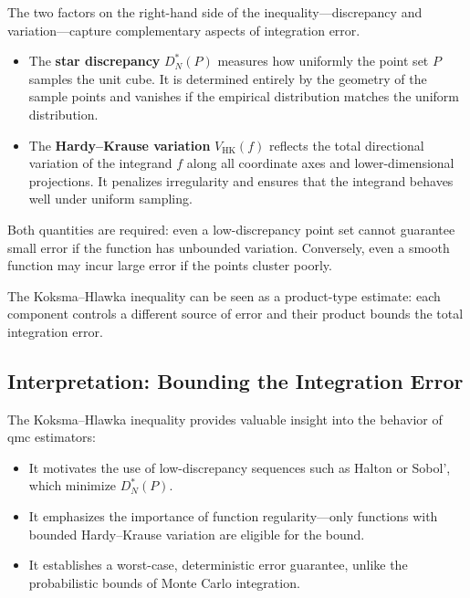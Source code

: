 The two factors on the right-hand side of the inequality—discrepancy and variation—capture complementary aspects of integration error.

\begin{itemize}
    \item The \textbf{star discrepancy} $D_N^*(P)$ measures how uniformly the point set $P$ samples the unit cube. It is determined entirely by the geometry of the sample points and vanishes if the empirical distribution matches the uniform distribution.
    \item The \textbf{Hardy--Krause variation} $V_{\mathrm{HK}}(f)$ reflects the total directional variation of the integrand $f$ along all coordinate axes and lower-dimensional projections. It penalizes irregularity and ensures that the integrand behaves well under uniform sampling.
\end{itemize}

Both quantities are required: even a low-discrepancy point set cannot guarantee small error if the function has unbounded variation. Conversely, even a smooth function may incur large error if the points cluster poorly.

\begin{remark}
The Koksma--Hlawka inequality can be seen as a product-type estimate: each component controls a different source of error and their product bounds the total integration error.
\end{remark}


\subsection{Interpretation: Bounding the Integration Error}

The Koksma--Hlawka inequality provides valuable insight into the behavior of \acl{qmc} estimators:

\begin{itemize}
    \item It motivates the use of low-discrepancy sequences such as Halton or Sobol', which minimize $D_N^*(P)$.
    \item It emphasizes the importance of function regularity—only functions with bounded Hardy--Krause variation are eligible for the bound.
    \item It establishes a worst-case, deterministic error guarantee, unlike the probabilistic bounds of Monte Carlo integration.
\end{itemize}


